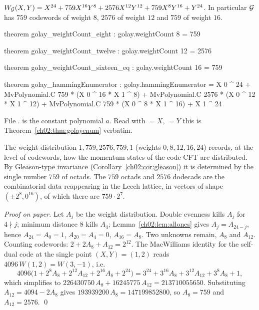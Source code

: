 \begin{theorem}\label{ch02:thm:golayenum}
$W_{\mathcal{G}}(X,Y)=X^{24}+759X^{16}Y^8+2576X^{12}Y^{12}+759X^8Y^{16}+Y^{24}$.  In particular
$\mathcal{G}$ has $759$ codewords of weight $8$, $2576$ of weight $12$ and $759$ of weight $16$.
\end{theorem}
\begin{leancode}
theorem golay_weightCount_eight : golay.weightCount 8 = 759

theorem golay_weightCount_twelve : golay.weightCount 12 = 2576

theorem golay_weightCount_sixteen_eq : golay.weightCount 16 = 759

theorem golay_hammingEnumerator :
    golay.hammingEnumerator
      = X 0 ^ 24 + MvPolynomial.C 759 * (X 0 ^ 16 * X 1 ^ 8)
        + MvPolynomial.C 2576 * (X 0 ^ 12 * X 1 ^ 12)
        + MvPolynomial.C 759 * (X 0 ^ 8 * X 1 ^ 16) + X 1 ^ 24
\end{leancode}
\begin{dictionary}
File .   is the constant polynomial
$a$.  Read with  $=X$,  $=Y$ this is Theorem~\ref{ch02:thm:golayenum}
verbatim.
\end{dictionary}
\begin{physics}
The weight distribution $1,759,2576,759,1$ (weights $0,8,12,16,24$) records, at the level of codewords, how the momentum states of the code CFT are distributed. By Gleason-type invariance (Corollary~\ref{ch02:cor:gleason}) it is determined by the single number $759$ of octads. The $759$ octads and $2576$ dodecads are the combinatorial data reappearing in the Leech lattice, in vectors of shape $(\pm2^8,0^{16})$, of which there are $759\cdot2^7$.
\end{physics}
\emph{Proof on paper.}  Let $A_j$ be the weight distribution.  Double evenness kills $A_j$ for
$4\nmid j$; minimum distance $8$ kills $A_4$; Lemma~\ref{ch02:lem:allones} gives $A_j=A_{24-j}$,
hence $A_{24}=A_0=1$, $A_{20}=A_4=0$, $A_{16}=A_8$.  Two unknowns remain, $A_8$ and $A_{12}$.
Counting codewords: $2+2A_8+A_{12}=2^{12}$.  The MacWilliams identity for the self-dual code at
the single point $(X,Y)=(1,2)$ reads $4096\,W(1,2)=W(3,-1)$, i.e.
\begin{equation*}
4096\bigl(1+2^8A_8+2^{12}A_{12}+2^{16}A_8+2^{24}\bigr)=3^{24}+3^{16}A_8+3^{12}A_{12}+3^8A_8+1,
\end{equation*}
which simplifies to $226430750\,A_8+16245775\,A_{12}=213710055650$.  Substituting
$A_{12}=4094-2A_8$ gives $193939200\,A_8=147199852800$, so $A_8=759$ and $A_{12}=2576$.  \qed

